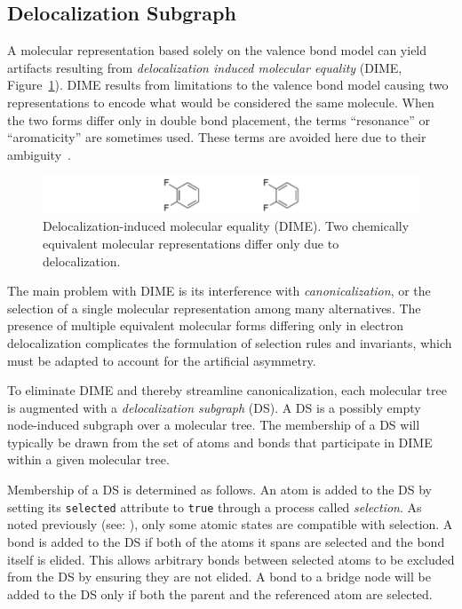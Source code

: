 \documentclass{article}
\def\ttt{\texttt}
\begin{document}
\subsection*{Delocalization Subgraph}
\label{delocalization-subgraph}

A molecular representation based solely on the valence bond model can yield artifacts resulting from \textit{delocalization induced molecular equality} (DIME, Figure~\ref{fig:dime}). DIME results from limitations to the valence bond model causing two representations to encode what would be considered the same molecule. When the two forms differ only in double bond placement, the terms \enquote{resonance} or \enquote{aromaticity} are sometimes used. These terms are avoided here due to their ambiguity~\cite{randic:2018,kerber:2006}.

\begin{figure}
    \centering
    \includegraphics[width=\columnwidth]{dime.pdf}
    \caption{Delocalization-induced molecular equality (DIME). Two chemically equivalent molecular representations differ only due to delocalization.}
    \label{fig:dime}
\end{figure}

The main problem with DIME is its interference with \textit{canonicalization}, or the selection of a single molecular representation among many alternatives. The presence of multiple equivalent molecular forms differing only in electron delocalization complicates the formulation of selection rules and invariants, which must be adapted to account for the artificial asymmetry.

To eliminate DIME and thereby streamline canonicalization, each molecular tree is augmented with a \textit{delocalization subgraph} (DS). A DS is a possibly empty node-induced subgraph over a molecular tree. The membership of a DS will typically be drawn from the set of atoms and bonds that participate in DIME within a given molecular tree.

Membership of a DS is determined as follows. An atom is added to the DS by setting its \ttt{selected} attribute to \ttt{true} through a process called \textit{selection}. As noted previously (see: ), only some atomic states are compatible with selection. A bond is added to the DS if both of the atoms it spans are selected and the bond itself is elided. This allows arbitrary bonds between selected atoms to be excluded from the DS by ensuring they are not elided. A bond to a bridge node will be added to the DS only if both the parent and the referenced atom are selected.
\end{document}
